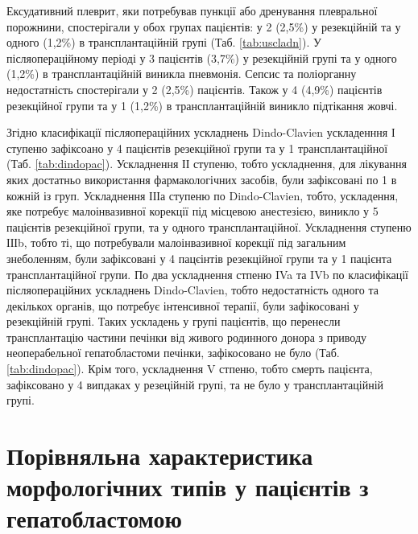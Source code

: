 Ексудативний плеврит, яки потребував пункції або дренування плевральної порожнини, спостерігали у обох групах пацієнтів: у 2 (2,5\%) у резекційній та у одного (1,2\%) в трансплантаційній групі (Таб. \ref{tab:uscladn}). 
У післяопераційному періоді у 3 пацієнтів (3,7\%) у резекційній групі та у одного (1,2\%) в трансплантаційній виникла пневмонія. Сепсис та поліорганну недостатність спостерігали у 2 (2,5\%) пацієнтів. 
Також у 4 (4,9\%) пацієнтів резекційної групи та у 1 (1,2\%) в трансплантаційній виникло підтікання жовчі.

Згідно класифікації післяопераційних ускладнень Dindo-Clavien ускладенння І ступеню зафіксоано у 4 пацієнтів резекційної групи та у 1 трансплантаційної (Таб. \ref{tab:dindopac}). Ускладнення ІІ ступеню, тобто ускладнення, для лікування яких достатньо використання фармакологічних засобів, були зафіксовані по 1 в кожній із груп. Ускладнення ІІІа ступеню по Dindo-Clavien, тобто, ускладення, яке потребує малоінвазивної корекції під місцевою анестезією, виникло у 5 пацієнтів резекційної групи, та у одного трансплантаційної. Ускладнення ступеню ІІІb, тобто ті, що потребували малоінвазивної корекції під загальним знеболенням, були зафіксовані у 4 пацєінтів резекційної групи та у 1 пацієнта трансплантаційної групи. 
По два ускладнення стпеню IVa та IVb по класифікації післяопераційних ускладнень Dindo-Clavien, тобто недостатність одного та декількох органів, що потребує інтенсивної терапії, були зафікосовані у резекційній групі. Таких ускладень у групі пацієнтів, що перенесли трансплантацію частини печінки від живого родинного донора з приводу неоперабельної гепатобластоми печінки, зафікосовано не було (Таб. \ref{tab:dindopac}). Крім того, ускладнення V стпеню, тобто смерть пацієнта, зафіксовано у 4 випдаках у резеційній групі, та не було у трансплантаційній групі.


\section{Порівняльна характеристика морфологічних типів  у пацієнтів з гепатобластомою}

